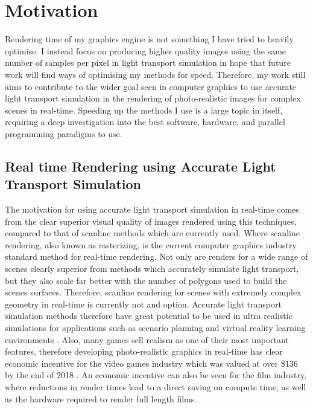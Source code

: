 \documentclass[ %
                    author={Callum Pearce},
                supervisor={Dr. Neill Campbell},
                    degree={MEng},
                     title={How effective are Temporal difference learning methods for reducing the number of zero contribution light paths while still accurately approximating Global Illumination in Path tracing?},
                  subtitle={},
                      type={research},
                      year={2019} ]{dissertation}
\begin{document}
\section{Motivation}

Rendering time of my graphics engine is not something I have tried to heavily 
optimise. I instead focus on producing higher quality images using the same 
number of samples per pixel in light transport simulation in hope that future 
work will find ways of optimising my methods for speed. Therefore, my work 
still aims to contribute to the wider goal seen in computer graphics to use 
accurate light transport simulation in the rendering of photo-realistic images 
for complex scenes in real-time.  Speeding up the methods I use is a large 
topic in itself, requiring a deep investigation into the best software, hardware, 
and parallel programming paradigms to use.\\

\subsection{Real time Rendering using Accurate Light Transport Simulation}
The motivation for using accurate light transport simulation in real-time 
comes from the clear superior visual quality of images rendered using this 
techniques, compared to that of scanline methods which are currently used. 
Where scanline rendering, also known as rasterizing, is the current computer 
graphics industry standard method for real-time rendering. Not only are 
renders for a wide range of scenes clearly superior from methods which 
accurately simulate light transport, but they also scale far better with the 
number of polygons used to build the scenes surfaces. Therefore, scanline 
rendering for scenes with extremely complex geometry in real-time is currently 
not and option. Accurate light transport simulation methods therefore have 
great potential to be used in ultra realistic simulations for applications such 
as scenario planning and virtual reality learning environments \cite{pan2006virtual}. 
Also, many games sell realism as one of their most important features, therefore 
developing photo-realistic graphics in real-time has clear economic incentive for 
the video games industry which was valued at over \$$136$ by the end of 2018 
\cite{bloomberg.com}. An economic incentive can also be seen for the film
industry, where reductions in render times lead to a direct saving on compute 
time, as well as the hardware required to render full length films.
\end{document}

